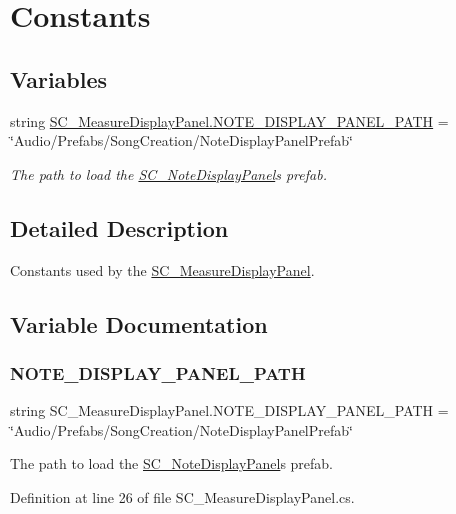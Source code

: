 \hypertarget{group___s_c___m_d_p_const}{}\section{Constants}
\label{group___s_c___m_d_p_const}
\subsection*{Variables}
\begin{DoxyCompactItemize}
\item 
string \hyperlink{group___s_c___m_d_p_const_ga6eee69b23fe2146403f41e4e862a3df9}{S\+C\+\_\+\+Measure\+Display\+Panel.\+N\+O\+T\+E\+\_\+\+D\+I\+S\+P\+L\+A\+Y\+\_\+\+P\+A\+N\+E\+L\+\_\+\+P\+A\+TH} = \char`\"{}Audio/Prefabs/Song\+Creation/Note\+Display\+Panel\+Prefab\char`\"{}
\begin{DoxyCompactList}\small\item\em The path to load the \hyperlink{group___doc_s_c___n_d_p}{S\+C\+\_\+\+Note\+Display\+Panel}\textquotesingle{}s prefab. \end{DoxyCompactList}\end{DoxyCompactItemize}


\subsection{Detailed Description}
Constants used by the \hyperlink{class_s_c___measure_display_panel}{S\+C\+\_\+\+Measure\+Display\+Panel}. 

\subsection{Variable Documentation}
\mbox{\label{group___s_c___m_d_p_const_ga6eee69b23fe2146403f41e4e862a3df9}} 
\subsubsection{\texorpdfstring{N\+O\+T\+E\+\_\+\+D\+I\+S\+P\+L\+A\+Y\+\_\+\+P\+A\+N\+E\+L\+\_\+\+P\+A\+TH}{NOTE\_DISPLAY\_PANEL\_PATH}}
{\footnotesize\ttfamily string S\+C\+\_\+\+Measure\+Display\+Panel.\+N\+O\+T\+E\+\_\+\+D\+I\+S\+P\+L\+A\+Y\+\_\+\+P\+A\+N\+E\+L\+\_\+\+P\+A\+TH = \char`\"{}Audio/Prefabs/Song\+Creation/Note\+Display\+Panel\+Prefab\char`\"{}\hspace{0.3cm}{\ttfamily [private]}}



The path to load the \hyperlink{group___doc_s_c___n_d_p}{S\+C\+\_\+\+Note\+Display\+Panel}\textquotesingle{}s prefab. 



Definition at line 26 of file S\+C\+\_\+\+Measure\+Display\+Panel.\+cs.

